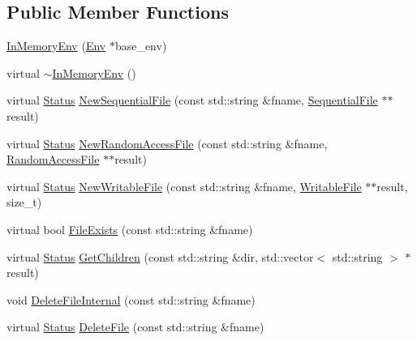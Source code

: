 \subsection*{Public Member Functions}
\begin{DoxyCompactItemize}
\item 
\hyperlink{classleveldb_1_1anonymous__namespace_02memenv_8cc_03_1_1_in_memory_env_a16c34d3ac17319ea033d9dcee2706d35}{In\+Memory\+Env} (\hyperlink{classleveldb_1_1_env}{Env} $\ast$base\+\_\+env)
\item 
virtual \hyperlink{classleveldb_1_1anonymous__namespace_02memenv_8cc_03_1_1_in_memory_env_a3787f9d4373c185ab53acf65430d1026}{$\sim$\+In\+Memory\+Env} ()
\item 
virtual \hyperlink{classleveldb_1_1_status}{Status} \hyperlink{classleveldb_1_1anonymous__namespace_02memenv_8cc_03_1_1_in_memory_env_affec236fcf049f0453f0f0a369e29bbe}{New\+Sequential\+File} (const std\+::string \&fname, \hyperlink{classleveldb_1_1_sequential_file}{Sequential\+File} $\ast$$\ast$result)
\item 
virtual \hyperlink{classleveldb_1_1_status}{Status} \hyperlink{classleveldb_1_1anonymous__namespace_02memenv_8cc_03_1_1_in_memory_env_a437d247890961e077ebb98ac9b628ad7}{New\+Random\+Access\+File} (const std\+::string \&fname, \hyperlink{classleveldb_1_1_random_access_file}{Random\+Access\+File} $\ast$$\ast$result)
\item 
virtual \hyperlink{classleveldb_1_1_status}{Status} \hyperlink{classleveldb_1_1anonymous__namespace_02memenv_8cc_03_1_1_in_memory_env_a064598d22e0b5742198f2b2f0b57cc79}{New\+Writable\+File} (const std\+::string \&fname, \hyperlink{classleveldb_1_1_writable_file}{Writable\+File} $\ast$$\ast$result, size\+\_\+t)
\item 
virtual bool \hyperlink{classleveldb_1_1anonymous__namespace_02memenv_8cc_03_1_1_in_memory_env_ac9cd8379c08285bb2f8a63deff2b8a6d}{File\+Exists} (const std\+::string \&fname)
\item 
virtual \hyperlink{classleveldb_1_1_status}{Status} \hyperlink{classleveldb_1_1anonymous__namespace_02memenv_8cc_03_1_1_in_memory_env_a32426b01216711ad37b316364e9183cc}{Get\+Children} (const std\+::string \&dir, std\+::vector$<$ std\+::string $>$ $\ast$result)
\item 
void \hyperlink{classleveldb_1_1anonymous__namespace_02memenv_8cc_03_1_1_in_memory_env_a4695d92782ac13892bcf6ebe185e0608}{Delete\+File\+Internal} (const std\+::string \&fname)
\item 
virtual \hyperlink{classleveldb_1_1_status}{Status} \hyperlink{classleveldb_1_1anonymous__namespace_02memenv_8cc_03_1_1_in_memory_env_afd8ee72e7e2644ea25fecbceced1740b}{Delete\+File} (const std\+::string \&fname)
$$
\end{DoxyCompactItemize}
